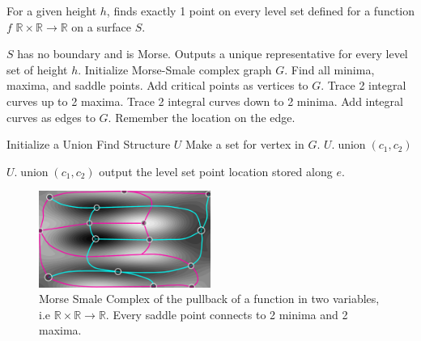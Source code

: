 \documentclass[12pt, letterpaper]{article}
\begin{document}
		\begin{algorithm}
		\caption{For a given height $h$, finds exactly 1 point on every level set defined for a function $f$ $\mathbb{R} \times \mathbb{R} \rightarrow \mathbb{R}$ on a surface $S$.}
		\label{alg:findAllUniqueLevelSets}
		\begin{algorithmic}

		\REQUIRE  $S$ has no boundary and is Morse.
		\ENSURE   Outputs a unique representative for every level set of height $h$.
		\STATE Initialize Morse-Smale complex graph $G$.
		\STATE Find all minima, maxima, and saddle points.
		\STATE Add critical points as vertices to $G$.
		\STATE Trace 2 integral curves up to 2 maxima.
		\STATE Trace 2 integral curves down to 2 minima.
		\STATE Add integral curves as edges to $G$.
			\STATE Remember the location on the edge.
		\ENDIF
		\ENDFOR

		\STATE {}
		\STATE Initialize a Union Find Structure $U$
		\STATE Make a set for vertex in $G$.
				\STATE $U.\operatorname{union}(c_{1}, c_{2})$ 
			\ENDIF
		\ENDFOR

				\STATE $U.\operatorname{union} (c_{1}, c_{2})$
				\STATE output the level set point location stored along $e$.
			\ENDIF
		\ENDFOR
		\end{algorithmic}
		\end{algorithm}


		\begin{figure}[h]
		\centering
		\includegraphics[width=0.5\textwidth]{minima_maxima_saddle_graph.png}
		\caption{Morse Smale Complex of the pullback of a function in two variables, i.e $\mathbb{R} \times \mathbb{R} \rightarrow \mathbb{R}$. Every saddle point connects to 2 minima and 2 maxima.}
		\label{fig:MorseSmale}
		\end{figure}
\end{document}
